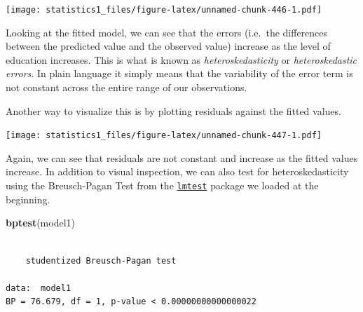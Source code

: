 \documentclass[]{article}
\newenvironment{Shaded}{\begin{snugshade}}{\end{snugshade}}
\newcommand{\KeywordTok}[1]{\textcolor[rgb]{0.13,0.29,0.53}{\textbf{#1}}}
\newcommand{\DataTypeTok}[1]{\textcolor[rgb]{0.13,0.29,0.53}{#1}}
\newcommand{\DecValTok}[1]{\textcolor[rgb]{0.00,0.00,0.81}{#1}}
\newcommand{\FloatTok}[1]{\textcolor[rgb]{0.00,0.00,0.81}{#1}}
\newcommand{\StringTok}[1]{\textcolor[rgb]{0.31,0.60,0.02}{#1}}
\newcommand{\OperatorTok}[1]{\textcolor[rgb]{0.81,0.36,0.00}{\textbf{#1}}}
\newcommand{\NormalTok}[1]{#1}
\theoremstyle{definition}
\theoremstyle{definition}
\theoremstyle{definition}
\theoremstyle{remark}
\begin{document}
\texttt{[image: statistics1\_files/figure-latex/unnamed-chunk-446-1.pdf]}

Looking at the fitted model, we can see that the errors (i.e.~the
differences between the predicted value and the observed value) increase
as the level of education increases. This is what is known as
\emph{heteroskedasticity} or \emph{heteroskedastic errors}. In plain
language it simply means that the variability of the error term is not
constant across the entire range of our observations.

Another way to visualize this is by plotting residuals against the
fitted values.

\begin{Shaded}
\end{Shaded}

\texttt{[image: statistics1\_files/figure-latex/unnamed-chunk-447-1.pdf]}

Again, we can see that residuals are not constant and increase as the
fitted values increase. In addition to visual inspection, we can also
test for heteroskedasticity using the Breusch-Pagan Test from the
\href{http://bit.ly/R_lmtest}{\texttt{lmtest}} package we loaded at the
beginning.

\begin{Shaded}
\begin{Highlighting}[]
\KeywordTok{bptest}\NormalTok{(model1)}
\end{Highlighting}
\end{Shaded}

\begin{verbatim}

    studentized Breusch-Pagan test

data:  model1
BP = 76.679, df = 1, p-value < 0.00000000000000022
\end{verbatim}
\end{document}
